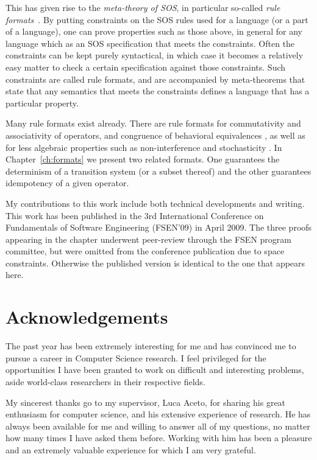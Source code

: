 This has given rise to the \emph{meta-theory of SOS}, in particular so-called
\emph{rule formats}~\cite{Aceto01,Mousavi07-TCS}. By putting constraints on the
SOS rules used for a language (or a part of a language), one can prove properties
such as those above, in general for any language which as an SOS specification that
meets the constraints. Often the constraints can be kept purely syntactical, in
which case it becomes a relatively easy matter to check a certain specification
against those constraints. Such constraints are called rule formats, and are
accompanied by meta-theorems that state that any semantics that meets the constraints
defines a language that has a particular property.

Many rule formats exist already. There are rule formats for 
commutativity \cite{Mousavi05-IPL} and 
associativity \cite{Mousavi08-CONCUR} of operators, and congruence of behavioral 
equivalences \cite{Verhoef95}, as well as for less algebraic properties such
as non-interference \cite{Tini04} and stochasticity \cite{Lanotte05}.
%
In Chapter~\ref{ch:formats} we present two related formats. 
One guarantees the determinism of a transition system (or a subset thereof) 
and the other guarantees idempotency of a given operator.

My contributions to this work include both technical developments and writing.
This work has been published in the 3rd International Conference on
Fundamentals of Software Engineering (FSEN'09) in April 2009. The three proofs
appearing in the chapter underwent peer-review through the FSEN program committee,
but were omitted from the conference publication due to space constraints. Otherwise
the published version is identical to the one that appears here.


\section{Acknowledgements}

The past year has been extremely interesting for me and has convinced me to 
pursue a career in Computer Science research. I feel privileged for the opportunities
I have been granted to work on difficult and interesting problems, aside world-class
researchers in their respective fields.

My sincerest thanks go to my supervisor, Luca Aceto, for sharing his great
enthusiasm for computer science, and his extensive experience of research. 
He has always been available for me and willing to answer all of my questions,
no matter how many times I have asked them before.
Working with him has been a pleasure and an extremely valuable experience for which
I am very grateful.

